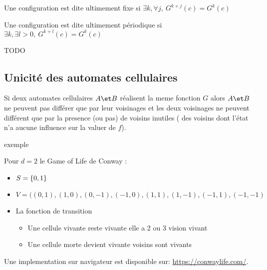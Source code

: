 \begin{definition}
	Une configuration est dite ultimement fixe si $\exists k, \forall j, \ G^{k+j}(c) =  G^{k}(c)$
\end{definition}


\begin{definition}
	Une configuration est dite ultimement périodique si $\exists k, \exists l>0, \ G^{k+l}(c) =  G^{k}(c)$
\end{definition}


\begin{exemple}
	TODO
\end{exemple}


\subsection{Unicité des automates cellulaires}


\begin{theorem}
	Si deux automates cellulaires $A \et B$ réalisent la meme fonction $G$ alors $A \et B$ ne peuvent pas différer que par
	leur voisinages et les deux voisinages ne peuvent différent que par la presence (ou pas) de voisins inutiles (\cad
	des voisins dont l'état n'a aucune influence sur la valuer de $f$).
\end{theorem}


\begin{exemple}
	exemple
\end{exemple}


\begin{exemple}
	Pour $d = 2$ le Game of Life de Conway \cite{conwayGOL}:
	\begin{itemize}
		\item $S = \left\{0,1\right\}$
		\item $V = ((0,1), (1,0), (0,-1), (-1,0), (1,1), (1,-1), (-1,1), (-1,-1)$
		\item La fonction de transition
		      \begin{itemize}
			      \item Une cellule vivante reste vivante \ssi elle a 2 ou 3 vision vivant
			      \item Une cellule morte devient vivante  voisins sont vivants
		      \end{itemize}
	\end{itemize}


	Une implementation sur navigateur est disponible sur: \url{https://conwaylife.com/}.
\end{exemple}

